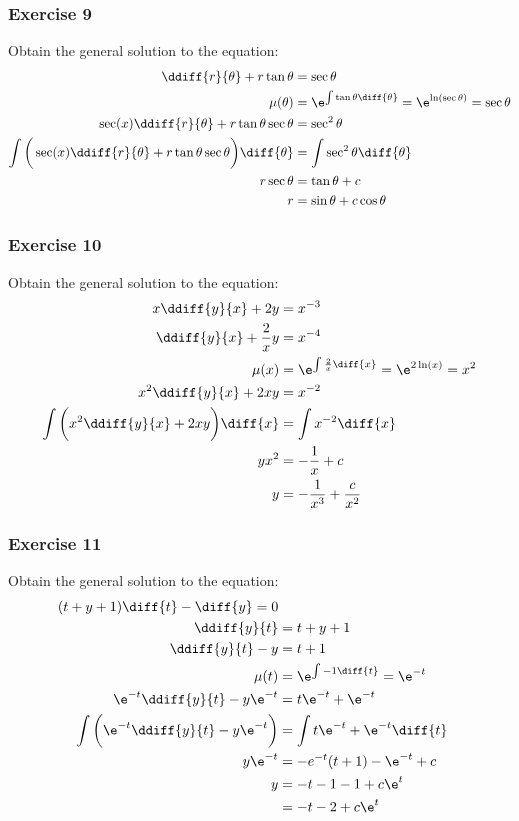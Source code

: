 \documentclass{math}
\begin{document}
\subsubsection*{Exercise 9}
Obtain the general solution to the equation:
\begin{align*}
  \ddiff{r}{\theta}+r\tan\theta &= \sec\theta \\
  \mu(\theta) &= \e^{\int\tan\theta\diff{\theta}} = \e^{\ln(\sec\theta)} =
    \sec\theta \\
  \sec(x)\ddiff{r}{\theta}+r\tan\theta\sec\theta &= \sec^2\theta \\
  \int\bigg(\sec(x)\ddiff{r}{\theta}+r\tan\theta\sec\theta\bigg)\diff{\theta} &=
    \int\sec^2\theta\diff{\theta} \\
  r\sec\theta &= \tan\theta+c \\
  r &= \sin\theta+c\cos\theta \\
\end{align*}

\subsubsection*{Exercise 10}
Obtain the general solution to the equation:
\begin{align*}
  x\ddiff{y}{x}+2y &= x^{-3} \\
  \ddiff{y}{x}+\frac{2}{x}y &= x^{-4} \\
  \mu(x) &= \e^{\int\frac{2}{x}\diff{x}} = \e^{2\ln(x)} = x^2 \\
  x^2\ddiff{y}{x}+2xy &= x^{-2} \\
  \int\bigg(x^2\ddiff{y}{x}+2xy\bigg)\diff{x} &= \int x^{-2}\diff{x} \\
  yx^2 &= -\frac{1}{x}+c \\
  y &= -\frac{1}{x^3}+\frac{c}{x^2}
\end{align*}

\subsubsection*{Exercise 11}
Obtain the general solution to the equation:
\begin{align*}
  (t+y+1)\diff{t}-\diff{y} = 0 \\
  \ddiff{y}{t} &= t+y+1 \\
  \ddiff{y}{t}-y &= t+1 \\
  \mu(t) &= \e^{\int-1\diff{t}} = \e^{-t} \\
  \e^{-t}\ddiff{y}{t}-y\e^{-t} &= t\e^{-t}+\e^{-t} \\
  \int\bigg(\e^{-t}\ddiff{y}{t}-y\e^{-t}\bigg) &=
    \int t\e^{-t}+\e^{-t}\diff{t} \\
  y\e^{-t} &= -e^{-t}(t+1)-\e^{-t}+c \\
  y &= -t-1-1+c\e^t \\
  &= -t-2+c\e^t
\end{align*}
\end{document}
